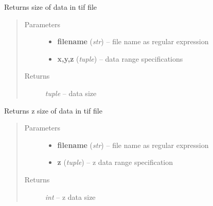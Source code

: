 \documentclass[letterpaper,10pt,english]{sphinxmanual}
\begin{document}
\begin{fulllineitems}
\label{api/ClearMap.IO:ClearMap.IO.TIF.dataSize}
Returns size of data in tif file
\begin{quote}\begin{description}
\item[{Parameters}] \leavevmode\begin{itemize}
\item {} 
\textbf{filename} (\emph{str}) --
file name as regular expression

\item {} 
\textbf{x,y,z} (\emph{tuple}) --
data range specifications

\end{itemize}

\item[{Returns}] \leavevmode
\emph{tuple} --
data size

\end{description}\end{quote}

\end{fulllineitems}


\begin{fulllineitems}
\label{api/ClearMap.IO:ClearMap.IO.TIF.dataZSize}
Returns z size of data in tif file
\begin{quote}\begin{description}
\item[{Parameters}] \leavevmode\begin{itemize}
\item {} 
\textbf{filename} (\emph{str}) --
file name as regular expression

\item {} 
\textbf{z} (\emph{tuple}) --
z data range specification

\end{itemize}

\item[{Returns}] \leavevmode
\emph{int} --
z data size

\end{description}\end{quote}

\end{fulllineitems}
\end{document}
